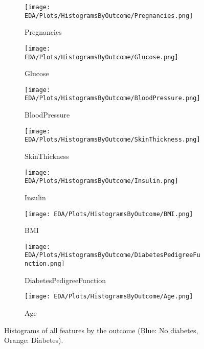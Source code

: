 \begin{figure}[H]
    \centering
    \begin{subfigure}[b]{0.45\textwidth}
        \texttt{[image: EDA/Plots/HistogramsByOutcome/Pregnancies.png]}
        \caption{Pregnancies}
        \label{fig:PregnanciesByOutcomeHist}
    \end{subfigure}
    \hfill
    \begin{subfigure}[b]{0.45\textwidth}
        \texttt{[image: EDA/Plots/HistogramsByOutcome/Glucose.png]}
        \caption{Glucose}
        \label{fig:GlucoseByOutcomeHist}
    \end{subfigure}
    
    \vspace{1em}
    
    \begin{subfigure}[b]{0.45\textwidth}
        \texttt{[image: EDA/Plots/HistogramsByOutcome/BloodPressure.png]}
        \caption{BloodPressure}
        \label{fig:BloodPressureByOutcomeHist}
    \end{subfigure}
    \hfill
    \begin{subfigure}[b]{0.45\textwidth}
        \texttt{[image: EDA/Plots/HistogramsByOutcome/SkinThickness.png]}
        \caption{SkinThickness}
        \label{fig:SkinThicknessByOutcomeHist}
    \end{subfigure}
    
    \vspace{1em}
    
    \begin{subfigure}[b]{0.45\textwidth}
        \texttt{[image: EDA/Plots/HistogramsByOutcome/Insulin.png]}
        \caption{Insulin}
        \label{fig:InsulinByOutcomeHist}
    \end{subfigure}
    \hfill
    \begin{subfigure}[b]{0.45\textwidth}
        \texttt{[image: EDA/Plots/HistogramsByOutcome/BMI.png]}
        \caption{BMI}
        \label{fig:BMIByOutcomeHist}
    \end{subfigure}
    
    \vspace{1em}
    
    \begin{subfigure}[b]{0.45\textwidth}
        \texttt{[image: EDA/Plots/HistogramsByOutcome/DiabetesPedigreeFunction.png]}
        \caption{DiabetesPedigreeFunction}
        \label{fig:PedigreeByOutcomeHist}
    \end{subfigure}
    \hfill
    \begin{subfigure}[b]{0.45\textwidth}
        \texttt{[image: EDA/Plots/HistogramsByOutcome/Age.png]}
        \caption{Age}
        \label{fig:AgeByOutcomeHist}
    \end{subfigure}
    
    \caption{Histograms of all features by the outcome (Blue: No diabetes, Orange: Diabetes).}
    \label{fig:AllHistogramsByOutcome}
\end{figure}


